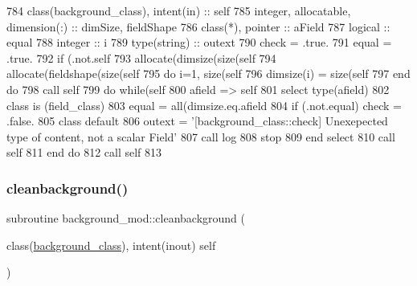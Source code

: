 \begin{DoxyCode}
784     \textcolor{keywordtype}{class}(background\_class), \textcolor{keywordtype}{intent(in)} :: self
785     \textcolor{keywordtype}{integer}, \textcolor{keywordtype}{allocatable}, \textcolor{keywordtype}{dimension(:)} :: dimSize, fieldShape
786     \textcolor{keywordtype}{class}(*), \textcolor{keywordtype}{pointer} :: aField
787     \textcolor{keywordtype}{logical} :: equal
788     \textcolor{keywordtype}{integer} :: i
789     \textcolor{keywordtype}{type}(string) :: outext
790     check = .true.
791     equal = .true.
792     \textcolor{keywordflow}{if} (.not.self%
793     \textcolor{keyword}{allocate}(dimsize(\textcolor{keyword}{size}(self%
794     \textcolor{keyword}{allocate}(fieldshape(\textcolor{keyword}{size}(self%
795     \textcolor{keywordflow}{do} i=1, \textcolor{keyword}{size}(self%
796         dimsize(i) = \textcolor{keyword}{size}(self%
797 \textcolor{keywordflow}{    end do}
798     \textcolor{keyword}{call }self%
799     \textcolor{keywordflow}{do} \textcolor{keywordflow}{while}(self%
800         afield => self%
801         \textcolor{keywordflow}{select type}(afield)
802 \textcolor{keywordflow}{        class is} (field\_class)
803             equal = all(dimsize.eq.afield%
804             \textcolor{keywordflow}{if} (.not.equal) check = .false.
805 \textcolor{keywordflow}{            class default}
806             outext = \textcolor{stringliteral}{'[background\_class::check] Unexepected type of content, not a scalar Field'}
807             \textcolor{keyword}{call }log%
808             stop
809 \textcolor{keywordflow}{        end select}
810         \textcolor{keyword}{call }self%
811 \textcolor{keywordflow}{    end do}
812     \textcolor{keyword}{call }self%
813 
\end{DoxyCode}
\mbox{\label{namespacebackground__mod_a1610fcc9ce260beb3c35418e92a63391}} 
\subsubsection{\texorpdfstring{cleanbackground()}{cleanbackground()}}
{\footnotesize\ttfamily subroutine background\+\_\+mod\+::cleanbackground (\begin{DoxyParamCaption}\item[{class(\mbox{\hyperlink{structbackground__mod_1_1background__class}{background\+\_\+class}}), intent(inout)}]{self }\end{DoxyParamCaption})\hspace{0.3cm}{\ttfamily [private]}}



